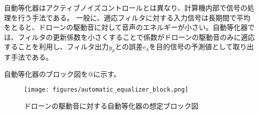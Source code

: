 自動等化器はアクティブノイズコントロールとは異なり、計算機内部で信号の処理を行う手法である。
一般に、適応フィルタに対する入力信号は長期間で平均をとると、ドローンの駆動音に対して音声のエネルギーが小さい。自動等化器では、フィルタの更新係数を小さくすることで係数がドローンの駆動音のみに適応することを利用し、フィルタ出力\(y_k\)との誤差\(e_k\)を目的信号の予測値として取り出す手法である。

自動等化器のブロック図を@に示す。

\begin{figure}
\centering
\texttt{[image: figures/automatic\_equalizer\_block.png]}
\caption{ドローンの駆動音に対する自動等化器の想定ブロック図}
\end{figure}
